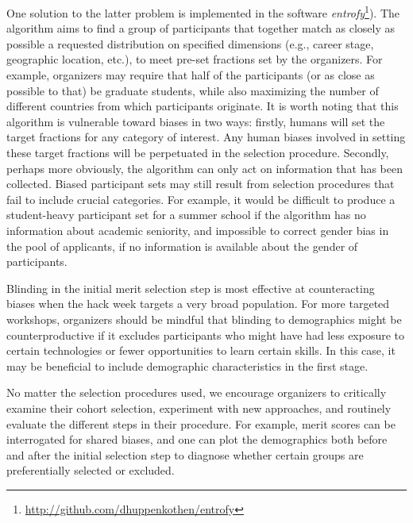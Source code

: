 One solution to the latter problem is implemented in the software \textit{entrofy}\footnote{\url{http://github.com/dhuppenkothen/entrofy}}). 
The algorithm aims to find a group of participants that together match as closely as possible a requested distribution on specified dimensions (e.g., career stage, geographic location, etc.), to meet pre-set fractions set by the organizers.
For example, organizers may require that half of the participants (or as close as possible to that) be graduate students, while also maximizing the number of different countries from which participants originate. 
It is worth noting that this algorithm is vulnerable toward biases in two ways: firstly, humans will set the target fractions for any category of interest.  
Any human biases involved in setting these target fractions will be perpetuated in the selection procedure. 
Secondly, perhaps more obviously, the algorithm can only act on information that has been collected.
Biased participant sets may still result from selection procedures that fail to include crucial categories. For example, it would be difficult to produce a student-heavy participant set for a summer school if the algorithm has no information about academic seniority, and impossible to correct gender bias in the pool of applicants, if no information is available about the gender of participants.

Blinding in the initial merit selection step is most effective at counteracting biases when the hack week targets a very broad population. 
For more targeted workshops, organizers should be mindful that blinding to demographics might be counterproductive if it excludes participants who might have had less exposure to certain technologies or fewer opportunities to learn certain skills. 
In this case, it may be beneficial to include demographic characteristics in the first stage. 

No matter the selection procedures used, we encourage organizers to critically examine their cohort selection, experiment with new approaches, and routinely evaluate the different steps in their procedure.  For example, merit scores can be interrogated for shared biases, and one can plot the demographics both before and after the initial selection step to diagnose whether certain groups are preferentially selected or excluded. 



